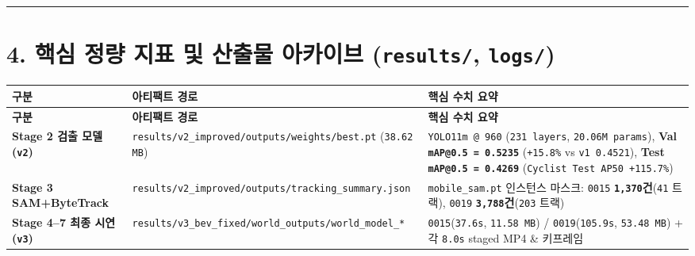 \documentclass[10.5pt,a4paper]{article}
\begin{document}
\par\noindent\rule{\textwidth}{0.4pt}\par\medskip

\section{4. 핵심 정량 지표 및 산출물 아카이브 (\texttt{results/\allowbreak{}}, \texttt{logs/\allowbreak{}})}


\begin{footnotesize}
\setlength{\tabcolsep}{4pt}
\setlength{\LTleft}{0pt}\setlength{\LTright}{0pt}
\begin{longtable}{>{\raggedright\arraybackslash}p{} >{\raggedright\arraybackslash}p{} >{\raggedright\arraybackslash}p{}}
\toprule
\textbf{구분} & \textbf{아티팩트 경로} & \textbf{핵심 수치 요약} \\
\midrule
\endfirsthead
\toprule
\textbf{구분} & \textbf{아티팩트 경로} & \textbf{핵심 수치 요약} \\
\midrule
\endhead
\bottomrule
\endfoot
\textbf{Stage 2 검출 모델 (\texttt{v2})} & \texttt{results/\allowbreak{}v2\_\allowbreak{}improved/\allowbreak{}outputs/\allowbreak{}weights/\allowbreak{}best.\allowbreak{}pt} (\texttt{38.\allowbreak{}62 MB}) & \texttt{YOLO11m @ 960} (\texttt{231 layers}, \texttt{20.\allowbreak{}06M params}), \textbf{Val \texttt{mAP@0.\allowbreak{}5 = 0.\allowbreak{}5235}} (\texttt{+15.\allowbreak{}8\%} vs \texttt{v1 0.\allowbreak{}4521}), \textbf{Test \texttt{mAP@0.\allowbreak{}5 = 0.\allowbreak{}4269}} (\texttt{Cyclist Test AP50 +115.\allowbreak{}7\%}) \\
\textbf{Stage 3 SAM+ByteTrack} & \texttt{results/\allowbreak{}v2\_\allowbreak{}improved/\allowbreak{}outputs/\allowbreak{}tracking\_\allowbreak{}summary.\allowbreak{}json} & \texttt{mobile\_\allowbreak{}sam.\allowbreak{}pt} 인스턴스 마스크: \texttt{0015} \textbf{\texttt{1,\allowbreak{}370}건}(\texttt{41} 트랙), \texttt{0019} \textbf{\texttt{3,\allowbreak{}788}건}(\texttt{203} 트랙) \\
\textbf{Stage 4--7 최종 시연 (\texttt{v3})} & \texttt{results/\allowbreak{}v3\_\allowbreak{}bev\_\allowbreak{}fixed/\allowbreak{}world\_\allowbreak{}outputs/\allowbreak{}world\_\allowbreak{}model\_\allowbreak{}*} & \texttt{0015}(\texttt{37.\allowbreak{}6s}, \texttt{11.\allowbreak{}58 MB}) / \texttt{0019}(\texttt{105.\allowbreak{}9s}, \texttt{53.\allowbreak{}48 MB}) + 각 \texttt{8.\allowbreak{}0s} staged MP4 \& 키프레임 \\

\end{longtable}
\end{footnotesize}
\end{document}
